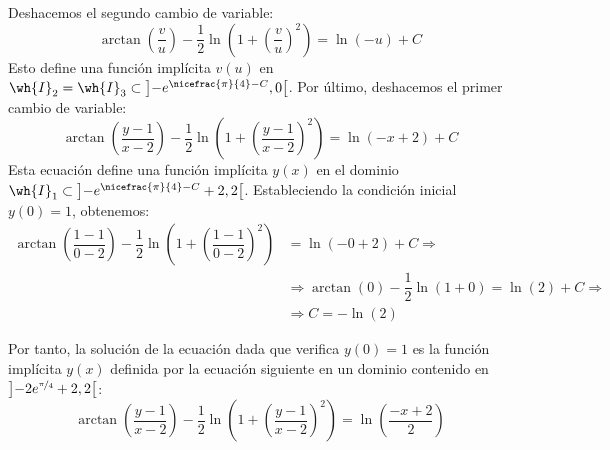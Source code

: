\begin{ejercicio}
    Deshacemos el segundo cambio de variable:
    \begin{equation*}
        \arctan\left(\dfrac{v}{u}\right) - \dfrac{1}{2}\ln\left(1+\left(\dfrac{v}{u}\right)^2\right) = \ln(-u)+C
    \end{equation*}
    Esto define una función implícita $v(u)$ en $\wh{I}_2=\wh{I}_3\subset \left]-e^{\nicefrac{\pi}{4}-C},0\right[$.
    Por último, deshacemos el primer cambio de variable:
    \begin{equation*}
        \arctan\left(\dfrac{y-1}{x-2}\right) - \dfrac{1}{2}\ln\left(1+\left(\dfrac{y-1}{x-2}\right)^2\right) = \ln(-x+2)+C
    \end{equation*}
    Esta ecuación define una función implícita $y(x)$ en el dominio $\wh{I}_1 \subset \left]-e^{\nicefrac{\pi}{4}-C}+2, 2\right[$. Estableciendo la condición inicial $y(0)=1$, obtenemos:
    \begin{align*}
        \arctan\left(\dfrac{1-1}{0-2}\right) - \dfrac{1}{2}\ln\left(1+\left(\dfrac{1-1}{0-2}\right)^2\right) &= \ln(-0+2)+C \Longrightarrow \\ &\Longrightarrow \arctan\left(0\right) - \dfrac{1}{2}\ln\left(1+0\right) = \ln(2)+C \Longrightarrow \\ &\Longrightarrow C=-\ln(2)
    \end{align*}

    Por tanto, la solución de la ecuación dada que verifica $y(0)=1$ es la función implícita $y(x)$ definida por la ecuación siguiente en un dominio contenido en $\left]-2e^{\nicefrac{\pi}{4}}+2,2\right[$:
    \begin{equation*}
        \arctan\left(\dfrac{y-1}{x-2}\right) - \dfrac{1}{2}\ln\left(1+\left(\dfrac{y-1}{x-2}\right)^2\right) = \ln\left(\dfrac{-x+2}{2}\right)
    \end{equation*}
\end{ejercicio}

